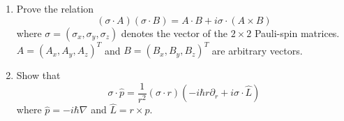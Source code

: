 \begin{Problem}

\begin{enumerate}[label=(\alph*)]
\item Prove the relation 
\[ (\sigma \cdot A)(\sigma \cdot B) = A \cdot B + i\sigma \cdot (A \times B)\]
where \( \sigma = (\sigma_x, \sigma_y, \sigma_z) \) denotes the vector of the \( 2 \times 2 \) Pauli-spin matrices. \( A = (A_x, A_y, A_z)^T \) and \( B = (B_x, B_y, B_z)^T \) are arbitrary vectors.

\item Show that 
\[ \sigma \cdot \hat{p} = \frac{1}{r^2}(\sigma \cdot r)\left(-i\hbar r\partial_r + i\sigma \cdot \hat{L}\right)\]
where \( \hat{p} = -i\hbar\nabla \) and \( \hat{L} = r \times \hat{p} \).
\end{enumerate}
\end{Problem}
